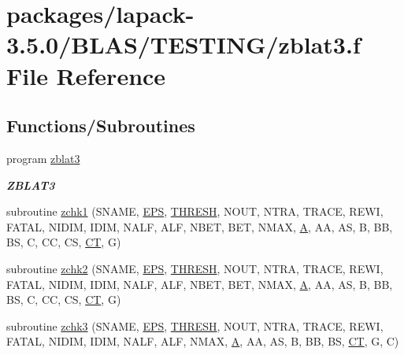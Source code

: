 \hypertarget{zblat3_8f}{}\section{packages/lapack-\/3.5.0/\+B\+L\+A\+S/\+T\+E\+S\+T\+I\+N\+G/zblat3.f File Reference}
\label{zblat3_8f}
\subsection*{Functions/\+Subroutines}
\begin{DoxyCompactItemize}
\item 
program \hyperlink{group__complex16__blas__testing_ga2368fa905c38dc0dc098ddd8fad7ad86}{zblat3}
\begin{DoxyCompactList}\small\item\em {\bfseries Z\+B\+L\+A\+T3} \end{DoxyCompactList}\item 
subroutine \hyperlink{zblat3_8f_aac2d04e4b03511557cedda1d99027d66}{zchk1} (S\+N\+A\+M\+E, \hyperlink{tukey_8c_a6ebf6899d6c1c8b7b9d09be872c05aae}{E\+P\+S}, \hyperlink{zlaqgs_8c_a0656018abfc9fa2821827415f5d5ea57}{T\+H\+R\+E\+S\+H}, N\+O\+U\+T, N\+T\+R\+A, T\+R\+A\+C\+E, R\+E\+W\+I, F\+A\+T\+A\+L, N\+I\+D\+I\+M, I\+D\+I\+M, N\+A\+L\+F, A\+L\+F, N\+B\+E\+T, B\+E\+T, N\+M\+A\+X, \hyperlink{classA}{A}, A\+A, A\+S, B, B\+B, B\+S, C, C\+C, C\+S, \hyperlink{tau_8h_ae9ab3801c1afb4f20cfd669d76aec283}{C\+T}, G)
\item 
subroutine \hyperlink{zblat3_8f_a70724c4d3e6f8e0321c2f7383cfe3fad}{zchk2} (S\+N\+A\+M\+E, \hyperlink{tukey_8c_a6ebf6899d6c1c8b7b9d09be872c05aae}{E\+P\+S}, \hyperlink{zlaqgs_8c_a0656018abfc9fa2821827415f5d5ea57}{T\+H\+R\+E\+S\+H}, N\+O\+U\+T, N\+T\+R\+A, T\+R\+A\+C\+E, R\+E\+W\+I, F\+A\+T\+A\+L, N\+I\+D\+I\+M, I\+D\+I\+M, N\+A\+L\+F, A\+L\+F, N\+B\+E\+T, B\+E\+T, N\+M\+A\+X, \hyperlink{classA}{A}, A\+A, A\+S, B, B\+B, B\+S, C, C\+C, C\+S, \hyperlink{tau_8h_ae9ab3801c1afb4f20cfd669d76aec283}{C\+T}, G)
\item 
subroutine \hyperlink{zblat3_8f_a7724957fffecdfacd6d467099aabced8}{zchk3} (S\+N\+A\+M\+E, \hyperlink{tukey_8c_a6ebf6899d6c1c8b7b9d09be872c05aae}{E\+P\+S}, \hyperlink{zlaqgs_8c_a0656018abfc9fa2821827415f5d5ea57}{T\+H\+R\+E\+S\+H}, N\+O\+U\+T, N\+T\+R\+A, T\+R\+A\+C\+E, R\+E\+W\+I, F\+A\+T\+A\+L, N\+I\+D\+I\+M, I\+D\+I\+M, N\+A\+L\+F, A\+L\+F, N\+M\+A\+X, \hyperlink{classA}{A}, A\+A, A\+S, B, B\+B, B\+S, \hyperlink{tau_8h_ae9ab3801c1afb4f20cfd669d76aec283}{C\+T}, G, C)

\end{DoxyCompactItemize}
